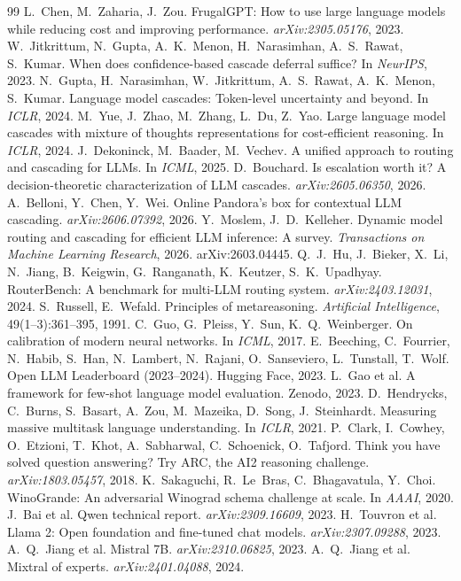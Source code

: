\documentclass[10pt,twocolumn]{article}
\begin{document}
\small

\begin{thebibliography}{99}
 L.~Chen, M.~Zaharia, J.~Zou. FrugalGPT: How to use large language models while reducing cost and improving performance. \emph{arXiv:2305.05176}, 2023.
 W.~Jitkrittum, N.~Gupta, A.~K.~Menon, H.~Narasimhan, A.~S.~Rawat, S.~Kumar. When does confidence-based cascade deferral suffice? In \emph{NeurIPS}, 2023.
 N.~Gupta, H.~Narasimhan, W.~Jitkrittum, A.~S.~Rawat, A.~K.~Menon, S.~Kumar. Language model cascades: Token-level uncertainty and beyond. In \emph{ICLR}, 2024.
 M.~Yue, J.~Zhao, M.~Zhang, L.~Du, Z.~Yao. Large language model cascades with mixture of thoughts representations for cost-efficient reasoning. In \emph{ICLR}, 2024.
 J.~Dekoninck, M.~Baader, M.~Vechev. A unified approach to routing and cascading for LLMs. In \emph{ICML}, 2025.
 D.~Bouchard. Is escalation worth it? A decision-theoretic characterization of LLM cascades. \emph{arXiv:2605.06350}, 2026.
 A.~Belloni, Y.~Chen, Y.~Wei. Online Pandora's box for contextual LLM cascading. \emph{arXiv:2606.07392}, 2026.
 Y.~Moslem, J.~D.~Kelleher. Dynamic model routing and cascading for efficient LLM inference: A survey. \emph{Transactions on Machine Learning Research}, 2026. arXiv:2603.04445.
 Q.~J.~Hu, J.~Bieker, X.~Li, N.~Jiang, B.~Keigwin, G.~Ranganath, K.~Keutzer, S.~K.~Upadhyay. RouterBench: A benchmark for multi-LLM routing system. \emph{arXiv:2403.12031}, 2024.
 S.~Russell, E.~Wefald. Principles of metareasoning. \emph{Artificial Intelligence}, 49(1--3):361--395, 1991.
 C.~Guo, G.~Pleiss, Y.~Sun, K.~Q.~Weinberger. On calibration of modern neural networks. In \emph{ICML}, 2017.
 E.~Beeching, C.~Fourrier, N.~Habib, S.~Han, N.~Lambert, N.~Rajani, O.~Sanseviero, L.~Tunstall, T.~Wolf. Open LLM Leaderboard (2023--2024). Hugging Face, 2023.
 L.~Gao et al. A framework for few-shot language model evaluation. Zenodo, 2023.
 D.~Hendrycks, C.~Burns, S.~Basart, A.~Zou, M.~Mazeika, D.~Song, J.~Steinhardt. Measuring massive multitask language understanding. In \emph{ICLR}, 2021.
 P.~Clark, I.~Cowhey, O.~Etzioni, T.~Khot, A.~Sabharwal, C.~Schoenick, O.~Tafjord. Think you have solved question answering? Try ARC, the AI2 reasoning challenge. \emph{arXiv:1803.05457}, 2018.
 K.~Sakaguchi, R.~Le~Bras, C.~Bhagavatula, Y.~Choi. WinoGrande: An adversarial Winograd schema challenge at scale. In \emph{AAAI}, 2020.
 J.~Bai et al. Qwen technical report. \emph{arXiv:2309.16609}, 2023.
 H.~Touvron et al. Llama 2: Open foundation and fine-tuned chat models. \emph{arXiv:2307.09288}, 2023.
 A.~Q.~Jiang et al. Mistral 7B. \emph{arXiv:2310.06825}, 2023.
 A.~Q.~Jiang et al. Mixtral of experts. \emph{arXiv:2401.04088}, 2024.
\end{thebibliography}
\end{document}
